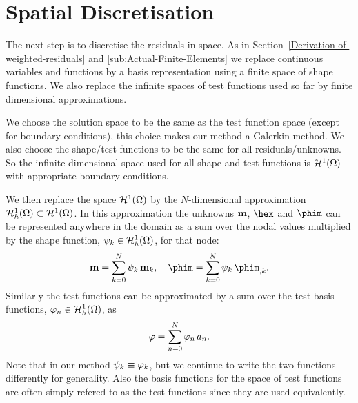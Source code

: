 \section{Spatial Discretisation}
\label{sec:spat-discr-resi}

The next step is to discretise the residuals in space. As in Section~\ref{Derivation-of-weighted-residuals} and \ref{sub:Actual-Finite-Elements} we replace continuous variables and functions by a basis representation using a finite space of shape functions. We also replace the infinite spaces of test functions used so far by finite dimensional approximations.

We choose the solution space to be the same as the test function space (except for boundary conditions), this choice makes our method a Galerkin method. We also choose the shape/test functions to be the same for all residuals/unknowns. So the infinite dimensional space used for all shape and test functions is $\mathcal{H}^1(\Omega)$ with appropriate boundary conditions.

We then replace the space $\mathcal{H}^1(\Omega)$ by the $N$-dimensional approximation ${\mathcal{H}^1_h(\Omega)} \subset \mathcal{H}^1(\Omega)$. In this approximation the unknowns $\mathbf{m}$, $\hex$ and $\phim$ can be represented anywhere in the domain as a sum over the nodal values multiplied by the shape function, ${\psi_k} \in {\mathcal{H}^1_h(\Omega)}$, for that node:
\begin{gather} %
  \mv = \sum_{k = 0}^{N} \sk \, \mv_k, \quad
  \phim = \sum_{k = 0}^{N} \sk \, \phim_{,k}.
  \label{eq:unknowns-basis}
\end{gather}
Similarly the test functions can be approximated by a sum over the test basis functions, ${\varphi_n} \in {\mathcal{H}^1_h(\Omega)}$, as
\begin{equation}
  \label{eq:47}
  \varphi = \sum_{n = 0}^{N} {\varphi_n} \, a_n.
\end{equation}
Note that in our method $\psi_k \equiv \varphi_k$, but we continue to write the two functions differently for generality. Also the basis functions for the space of test functions are often simply refered to as the test functions since they are used equivalently.

